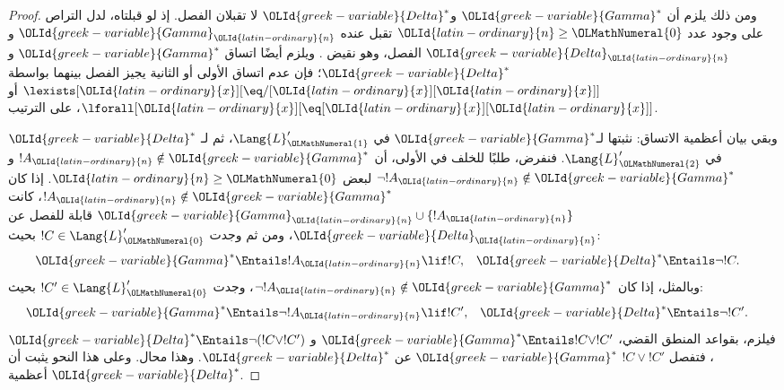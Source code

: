 \documentclass[../../../include/open-logic-section]{subfiles}
\begin{document}
\begin{proof}
ومن ذلك يلزم أن $\OLId{greek-variable}{Gamma}^*$ و$\OLId{greek-variable}{Delta}^*$ لا تقبلان الفصل. إذ لو قبلتاه، لدل التراص
على وجود عدد $\OLId{latin-ordinary}{n} \ge \OLMathNumeral{0}$ تقبل عنده $\OLId{greek-variable}{Gamma}_\OLId{latin-ordinary}{n}$ و$\OLId{greek-variable}{Delta}_\OLId{latin-ordinary}{n}$ الفصل، وهو نقيض
. ويلزم أيضًا اتساق $\OLId{greek-variable}{Gamma}^*$ و$\OLId{greek-variable}{Delta}^*$؛ فإن
عدم اتساق الأولى أو الثانية يجيز الفصل بينهما بواسطة
$\lexists[\OLId{latin-ordinary}{x}][\eq/[\OLId{latin-ordinary}{x}][\OLId{latin-ordinary}{x}]]$ أو $\lforall[\OLId{latin-ordinary}{x}][\eq[\OLId{latin-ordinary}{x}][\OLId{latin-ordinary}{x}]]$، على الترتيب.

وبقي بيان أعظمية الاتساق: نثبتها لـ$\OLId{greek-variable}{Gamma}^*$ في $\Lang{L}'_\OLMathNumeral{1}$، ثم لـ
$\OLId{greek-variable}{Delta}^*$ في $\Lang{L}'_\OLMathNumeral{2}$. فنفرض، طلبًا للخلف في الأولى، أن
$!A_\OLId{latin-ordinary}{n} \notin \OLId{greek-variable}{Gamma}^*$ و$\lnot !A_\OLId{latin-ordinary}{n} \notin \OLId{greek-variable}{Gamma}^*$ لبعض
$\OLId{latin-ordinary}{n} \ge \OLMathNumeral{0}$. إذا كان $!A_\OLId{latin-ordinary}{n} \notin \OLId{greek-variable}{Gamma}^*$، كانت
$\OLId{greek-variable}{Gamma}_\OLId{latin-ordinary}{n} \cup \{!A_\OLId{latin-ordinary}{n}\}$ قابلة للفصل عن $\OLId{greek-variable}{Delta}_\OLId{latin-ordinary}{n}$، ومن ثم وجدت
$!C \in \Lang{L}'_\OLMathNumeral{0}$ بحيث:
\begin{align*}
  \OLId{greek-variable}{Gamma}^* & \Entails !A_\OLId{latin-ordinary}{n} \lif !C, &
  \OLId{greek-variable}{Delta}^* & \Entails \lnot !C.
\end{align*}
وبالمثل، إذا كان $\lnot !A_\OLId{latin-ordinary}{n} \notin \OLId{greek-variable}{Gamma}^*$، وجدت
$!C' \in \Lang{L}'_\OLMathNumeral{0}$ بحيث:
\begin{align*}
  \OLId{greek-variable}{Gamma}^* & \Entails \lnot !A_\OLId{latin-ordinary}{n} \lif !C', &
  \OLId{greek-variable}{Delta}^* & \Entails \lnot !C'.
\end{align*}
فيلزم، بقواعد المنطق القضي، $\OLId{greek-variable}{Gamma}^* \Entails !C \lor !C'$ و
$\OLId{greek-variable}{Delta}^* \Entails \lnot (!C \lor !C')$، فتفصل $!C \lor !C'$
$\OLId{greek-variable}{Gamma}^*$ عن $\OLId{greek-variable}{Delta}^*$. وهذا محال. وعلى هذا النحو يثبت أن $\OLId{greek-variable}{Delta}^*$ أعظمية.


\end{proof}
\end{document}
